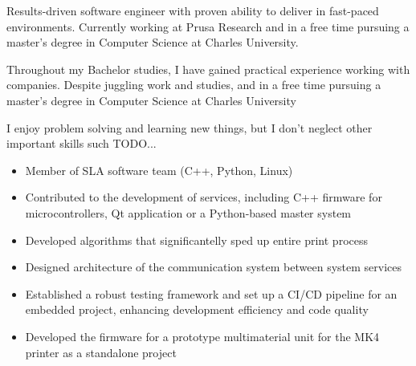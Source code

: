 \documentclass[10pt,a4paper,ragged2e]{altacv}
\begin{document}


\begin{fullwidth}
\makecvheader
\end{fullwidth}



Results-driven software engineer with proven ability to deliver in fast-paced environments. Currently working at Prusa Research and in a free time pursuing a master’s degree in Computer Science at Charles University.

\vspace{4px}

Throughout my Bachelor studies, I have gained practical experience working with companies.
Despite juggling work and studies,
and in a free time pursuing a master’s degree in Computer Science at Charles University


\vspace{4px}

I enjoy problem solving and learning new things, but I don't neglect other important skills such TODO...

\vspace{8px}



\begin{itemize}
\item Member of SLA software team (C++, Python, Linux)
\item Contributed to the development of services, including C++ firmware for microcontrollers, Qt application or a Python-based master system
\item Developed algorithms that significantelly sped up entire print process
\item Designed architecture of the communication system between system services
\item Established a robust testing framework and set up a CI/CD pipeline for an embedded project, enhancing development efficiency and code quality
\item Developed the firmware for a prototype multimaterial unit for the MK4 printer as a standalone project
\end{itemize}
\end{document}
